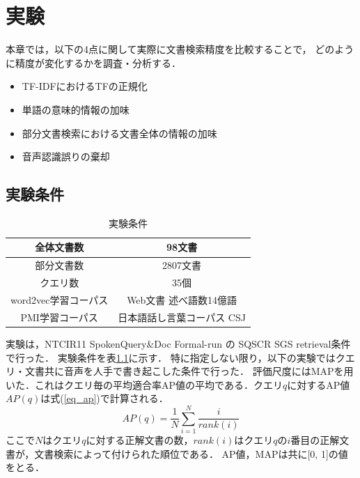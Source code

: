 
\chapter{実験} %
本章では，以下の4点に関して実際に文書検索精度を比較することで，
どのように精度が変化するかを調査・分析する．
\begin{itemize}
    \item TF-IDFにおけるTFの正規化                
    \item 単語の意味的情報の加味                  
    \item 部分文書検索における文書全体の情報の加味
    \item 音声認識誤りの棄却                      
\end{itemize}

\section{実験条件}
\begin{table}[htbp]
    \begin{center}
        \caption{実験条件}
        \begin{tabular}{|c|c|}
            \hline
            全体文書数 & 98文書 \\ \hline
            部分文書数 & 2807文書 \\ \hline
            クエリ数 & 35個 \\ \hline
            word2vec学習コーパス & Web文書 述べ語数14億語 \\ \hline
            PMI学習コーパス & 日本語話し言葉コーパス CSJ \\ \hline
        \end{tabular}
        \label{t_condition}
    \end{center}
\end{table}
実験は，NTCIR11 SpokenQuery\&Doc Formal-run の SQSCR SGS retrieval条件で行った．
実験条件を表\ref{t_condition}に示す．
特に指定しない限り，以下の実験ではクエリ・文書共に音声を人手で書き起こした条件で行った．
評価尺度にはMAPを用いた．これはクエリ毎の平均適合率AP値の平均である．クエリ$q$に対するAP値$AP(q)$は式(\ref{eq_ap})で計算される．
\begin{equation}
    AP(q) = \frac{1}{N} \sum^N_{i=1} \frac{i}{rank(i)}    \label{eq_ap}
\end{equation}
ここで$N$はクエリ$q$に対する正解文書の数，$rank(i)$はクエリ$q$の$i$番目の正解文書が，文書検索によって付けられた順位である．
AP値，MAPは共に[0, 1]の値をとる．

